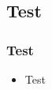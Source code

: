 \subsection{Test}
	\begin{frame}
		\frametitle{Test}
	\begin{itemize}
		\item Test
	\end{itemize}
\end{frame}